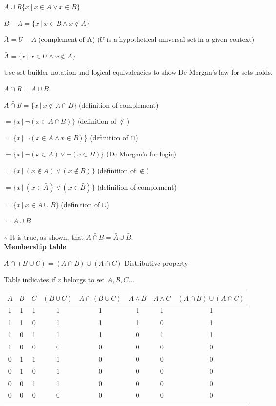 \documentclass[english,openany]{book}
\begin{document}
	$A \cup B \{ x \ | \ x \in A \lor x \in B\}$

	$B - A = \{ x \ |\ x \in B \wedge x \notin A \}$

	$\bar{A} = U - A$ (complement of A) ($U$ is a hypothetical universal set in a given context)

	$\bar{A} = \{ x \ |\ x \in U \wedge x \notin A \}$

		Use set builder notation and logical equivalencies to show De Morgan's law for sets holds.

	$\bar{A \cap B} = \bar{A} \cup \bar{B}$

	$\bar{A \cap B} = \{ x \ |\ x \notin A \cap B\} $  (definition of complement)

	$= \{ x \ |\ \neg(x \in A \cap B) \} $ (definition of $\notin$)

	$= \{ x \ |\ \neg(x \in A \wedge x \in B) \} $ (definition of $\cap$)

	$= \{ x \ |\ \neg(x \in A) \lor \neg(x \in B) \} $ (De Morgan's for logic)

	$= \{ x \ |\ (x \notin A) \lor (x \notin B) \} $ (definition of $\notin$)

	$= \{ x \ |\ (x \in \bar{A}) \lor (x \in \bar{B}) \} $ (definition of complement)

	$= \{ x \ |\ x \in \bar{A} \cup \bar{B} \} $ (definition of $\cup$)

	$= \bar{A} \cup \bar{B}$

	$\therefore$ It is true, as shown, that $\bar{A \cap B} = \bar{A} \cup \bar{B}$.\\

	\textbf{Membership table}

	$A \cap (B \cup C) = (A \cap B) \cup (A \cap C)$ Distributive property

	Table indicates if $x$ belongs to set $A, B, C \dots$

	\begin{tabular}{c|c|c|c|c|c|c|c}
		$A$&$B$&$C$&$(B \cup C)$&$A \cap (B \cup C)$&$A \wedge B$&$A \wedge C$&$(A \cap B) \cup (A \cap C)$\\
		\hline
		1&1&1&1&1&1&1&1\\
		1&1&0&1&1&1&0&1\\
		1&0&1&1&1&0&1&1\\
		1&0&0&0&0&0&0&0\\
		0&1&1&1&0&0&0&0\\
		0&1&0&1&0&0&0&0\\
		0&0&1&1&0&0&0&0\\
		0&0&0&0&0&0&0&0\\
	\end{tabular}
\end{document}
